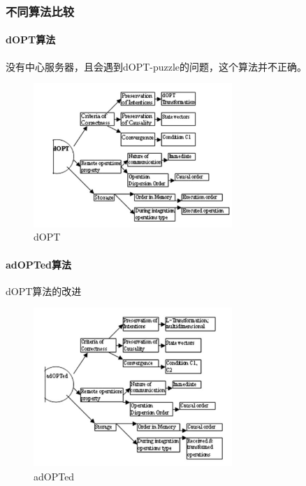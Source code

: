 \documentclass[11pt]{ctexart}
\begin{document}
\subsubsection{不同算法比较}
\paragraph{dOPT算法}
没有中心服务器，且会遇到dOPT-puzzle的问题，这个算法并不正确。
\begin{figure}[H]
    \begin{center}
    \includegraphics[width=0.67\textwidth]{figures/dOPT.png}
    \caption{dOPT}
    \end{center}
\end{figure}
\paragraph{adOPTed算法}
dOPT算法的改进
\begin{figure}[H]
    \begin{center}
    \includegraphics[width=0.67\textwidth]{figures/adOPTed.png}
    \caption{adOPTed}
    \end{center}
\end{figure}
\end{document}
